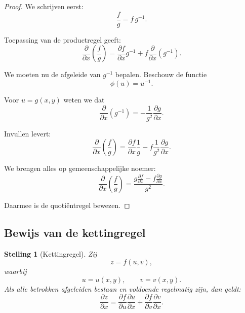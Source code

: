 \documentclass[11pt,a4paper]{article}
\newtheorem{theorem}{Stelling}[section]
\begin{document}
    \begin{proof}
        We schrijven eerst:
        \[
            \frac{f}{g}=f\,g^{-1}.
        \]

        Toepassing van de productregel geeft:
        \[
            \frac{\partial}{\partial x}\left(\frac{f}{g}\right)
            =
            \frac{\partial f}{\partial x}g^{-1}
            +
            f\frac{\partial}{\partial x}(g^{-1}).
        \]

        We moeten nu de afgeleide van $g^{-1}$ bepalen. Beschouw de functie
        \[
            \phi(u)=u^{-1}.
        \]

        Voor $u=g(x,y)$ weten we dat
        \[
            \frac{\partial}{\partial x}(g^{-1})
            =
            -\frac{1}{g^2}\frac{\partial g}{\partial x}.
        \]

        Invullen levert:
        \[
            \frac{\partial}{\partial x}\left(\frac{f}{g}\right)
            =
            \frac{\partial f}{\partial x}\frac{1}{g}
            -
            f\frac{1}{g^2}\frac{\partial g}{\partial x}.
        \]

        We brengen alles op gemeenschappelijke noemer:
        \[
            \frac{\partial}{\partial x}\left(\frac{f}{g}\right)
            =
            \frac{
                g\frac{\partial f}{\partial x}
                -
                f\frac{\partial g}{\partial x}
            }{g^2}.
        \]

        Daarmee is de quoti\"entregel bewezen.
    \end{proof}

    \subsection{Bewijs van de kettingregel}

    \begin{theorem}[Kettingregel]
Zij
\[
    z=f(u,v),
\]
waarbij
\[
    u=u(x,y), \qquad v=v(x,y).
\]
Als alle betrokken afgeleiden bestaan en voldoende regelmatig zijn, dan geldt:
\[
    \frac{\partial z}{\partial x}
    =
    \frac{\partial f}{\partial u}\frac{\partial u}{\partial x}
    +
    \frac{\partial f}{\partial v}\frac{\partial v}{\partial x}.
\]
    \end{theorem}
\end{document}
